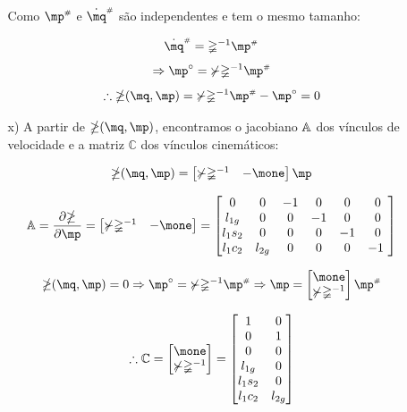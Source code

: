 \begin{itemize}
\begin{itemize}
	Como $\mp\ssh$ e $\dot{\mq}\ssh$ s\~ao independentes e tem o mesmo tamanho:

	$$ \dot{\mq}\ssh = \mathbb{\Psi}^{-1} \mp\ssh $$
	$$ \Rightarrow  \mp^\circ = \mathbb{\Upsilon} \mathbb{\Psi}^{-1} \mp\ssh $$
	\begin{equation}
	\therefore \mathbb{\Lambda}(\mq,\mp) = \mathbb{\Upsilon} \mathbb{\Psi}^{-1} \mp\ssh - \mp^\circ  = 0
	\end{equation}
	
	\item[x)] A partir de $\mathbb{\Lambda} (\mq, \mp)$, encontramos o jacobiano $\mathbb{A}$ dos v\'inculos de velocidade e a matriz $\mathbb{C}$ dos v\'inculos cinem\'aticos:
	
	$$ \mathbb{\Lambda}(\mq, \mp) = \begin{bmatrix}
	\mathbb{\Upsilon} \mathbb{\Psi}^{-1} & -\mone\\
	\end{bmatrix} \mp  $$
	
	\begin{equation}
	\mA = \frac{\partial \mathbb{\Lambda}}{\partial \mp} = \begin{bmatrix}
	\mathbb{\Upsilon} \mathbb{\Psi}^{-1} & -\mone\\
	\end{bmatrix}
	=
	\begin{bmatrix}
	0 & 0 & -1 & 0 & 0 & 0 \\
	l_{1g} & 0 & 0 & -1 & 0 & 0\\
	l_1 s_{2} & 0 & 0 & 0 & -1 & 0\\
	l_1 c_{2} & l_{2g} & 0 & 0 & 0 & -1\
	\end{bmatrix}
	\end{equation}
	
	$$ \mathbb{\Lambda}(\mq, \mp) = 0 \Rightarrow \mp^\circ = \mathbb{\Upsilon} \mathbb{\Psi}^{-1} \mp\ssh \Rightarrow \mp =
	\begin{bmatrix}
	\mone\\
	\mathbb{\Upsilon} \mathbb{\Psi}^{-1}
	\end{bmatrix}
	\mp\ssh
	$$
	
	\begin{equation}
	\therefore \mathbb{C} =
	\begin{bmatrix}
	\mone\\
	\mathbb{\Upsilon} \mathbb{\Psi}^{-1}
	\end{bmatrix}
	=
	\begin{bmatrix}
	1 & 0 \\
	0 & 1 \\
	0 & 0 \\
	l_{1g} & 0\\
	l_1 s_{2} & 0 \\
	l_1 c_{2} & l_{2g} \\
	\end{bmatrix}
	\end{equation}
	

\end{itemize}
\end{itemize}
